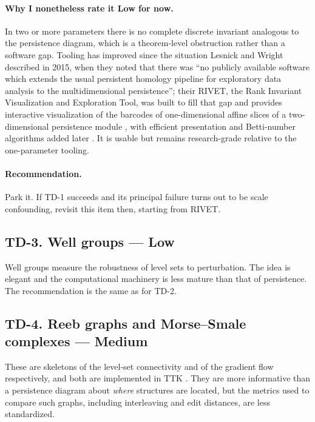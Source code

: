 \documentclass[11pt]{article}
\newcommand{\Med}{Medium}
\newcommand{\Low}{\textbf{Low}}
\begin{document}
\paragraph{Why I nonetheless rate it Low for now.} In two or more parameters there is no
complete discrete invariant analogous to the persistence diagram, which is a theorem-level
obstruction rather than a software gap. Tooling has improved since the situation Lesnick and
Wright described in 2015, when they noted that there was ``no publicly available software
which extends the usual persistent homology pipeline for exploratory data analysis to the
multidimensional persistence''; their RIVET, the Rank Invariant Visualization and Exploration
Tool, was built to fill that gap and provides interactive visualization of the barcodes of
one-dimensional affine slices of a two-dimensional persistence module
\cite{lesnickwright2015}, with efficient presentation and Betti-number algorithms added
later \cite{lesnickwright2022}. It is usable but remains research-grade relative to the
one-parameter tooling.

\paragraph{Recommendation.} Park it. If TD-1 succeeds and its principal failure turns out to
be scale confounding, revisit this item then, starting from RIVET.

\subsection{TD-3. Well groups --- \Low{}}

Well groups measure the robustness of level sets to perturbation. The idea is elegant and
the computational machinery is less mature than that of persistence. The recommendation is
the same as for TD-2.

\subsection{TD-4. Reeb graphs and Morse--Smale complexes --- \Med{}}

These are skeletons of the level-set connectivity and of the gradient flow respectively, and
both are implemented in TTK \cite{tierny2018}. They are more informative than a persistence
diagram about \emph{where} structures are located, but the metrics used to compare such
graphs, including interleaving and edit distances, are less standardized.
\end{document}

